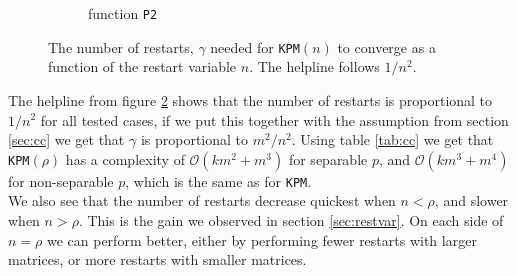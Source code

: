 \begin{figure}[H]
\begin{subfigure}[b]{0.45\textwidth}
                \caption{function \texttt{P2}}
                \label{fig:ant2}
        \end{subfigure}
        \caption{The number of restarts, $\gamma$ needed for \texttt{KPM}$(n)$ to converge as a function of the restart variable $n$. The helpline follows $1/n^2$.}\label{fig:ant}
\end{figure}

The helpline from figure \ref{fig:ant} shows that the number of restarts is proportional to $1/n^2$ for all tested cases, if we put this together with the assumption from section \ref{sec:cc} we get that $\gamma$ is proportional to  $m^2/n^2$. Using table \ref{tab:cc} we get that \texttt{KPM}$(\rho)$ has a complexity of $\mathcal{O}(km^2 + m^3)$ for separable $p$, and $\mathcal{O}(km^3 + m^4)$ for non-separable $p$, which is the same as for \texttt{KPM}.\\

We also see that the number of restarts decrease quickest when $n < \rho $, and slower when $n > \rho$. This is the gain we observed in section \ref{sec:restvar}. On each side of $n = \rho$ we can perform better, either by performing fewer restarts with larger matrices, or more restarts with smaller matrices. \\
